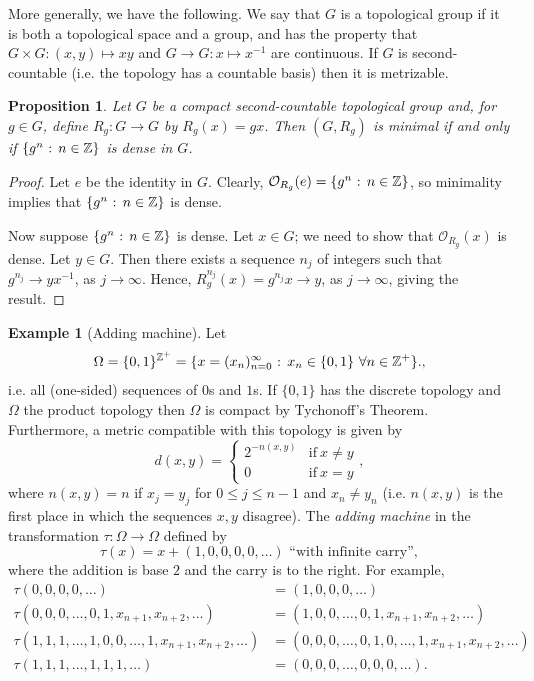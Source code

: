 \documentclass[12pt]{article}
\newtheorem{proposition}[theorem]{Proposition}
\theoremstyle{definition}
\newtheorem{example}[theorem]{Example}
\theoremstyle{remark}
\begin{document}
More generally, we have the following. We say that $G$ is a topological group if it is both a
topological space and a group, and has the property that $G \times G : (x,y) \mapsto xy$ and $G \to G : x \mapsto x^{-1}$ are
continuous. If $G$ is second-countable (i.e. the topology has a countable basis)
then it is metrizable.

\begin{proposition}
Let $G$ be a compact second-countable topological group and, for $g \in G$, define $R_g : G \to G$ by
$R_g(x) = gx$. Then $(G,R_g)$ is minimal if and only if 
$\{g^n \hbox{ : } n \in \mathbb Z\}$ is dense in $G$. 
\end{proposition}

\begin{proof}
Let $e$ be the identity in $G$. Clearly, $\mathcal O_{R_g}(e) = \{g^n \hbox{ : } n \in \mathbb Z\}$, so minimality
implies that $\{g^n \hbox{ : } n \in \mathbb Z\}$ is dense.

Now suppose $\{g^n \hbox{ : } n \in \mathbb Z\}$ is dense. 
Let $x \in G$; we need to show that $\mathcal O_{R_g}(x)$ is dense.
Let $y \in G$. Then there exists a sequence $n_j$
of integers such that $g^{n_j} \to yx^{-1}$, as $j \to \infty$.
Hence, $R_g^{n_j}(x) = g^{n_j}x \to y$, as $j \to \infty$, giving the result.
\end{proof}

\begin{example} [Adding machine]
Let 
\[
\Omega = \{0,1\}^{\mathbb Z^+} = \{x = (x_n)_{n=0}^\infty \hbox{ : } x_n \in \{0,1\} \ \forall n\in \mathbb Z^+\}.,
\]
i.e. all (one-sided) sequences of $0$s and $1$s. 
If $\{0,1\}$ has the discrete topology and $\Omega$ the product topology then $\Omega$ is compact by Tychonoff's 
Theorem. Furthermore, a metric compatible with this topology is given by 
\[
d( x,y) =
\begin{cases} 
2^{-n(x,y)} & \text{if}\ x \not=y \\
 0 & \text{if} \ x=y
 \end{cases},
 \]
 where
$n(x,y) =n$ if $x_{j} = y_{j}$ for $0 \le j \leq n-1$ and $x_{n} \not= y_{n}$  
(i.e. $n(x,y)$ is the first place in which the sequences $x,y$ disagree).
The {\it adding machine} in the transformation $\tau : \Omega \to \Omega$ defined by 
\[\tau(x) = x+ (1,0,0,0,0,\ldots) \text{ ``with infinite carry''},
\]
where the addition is base $2$ and the carry is to the right.
For example,
\begin{align*}
\tau(0,0,0,0,\ldots) &=  (1,0,0,0,\ldots) \\
\tau(0,0,0,\ldots,0,1,x_{n+1},x_{n+2},\ldots) &= 
(1,0, 0, \ldots, 0,1,x_{n+1},x_{n+2},\ldots) \\
\tau(1,1,1, \ldots, 1,0, 0, \ldots, 1, x_{n+1},x_{n+2}, \ldots) 
&=  (0,0,0, \ldots,0,1,0,\ldots,1,x_{n+1},x_{n+2},\ldots)
\\
\tau(1,1,1, \ldots, 1,1, 1, \ldots) &=  (0,0,0, \ldots,0,0, 0, \ldots).
\end{align*}
\end{example}
\end{document}
